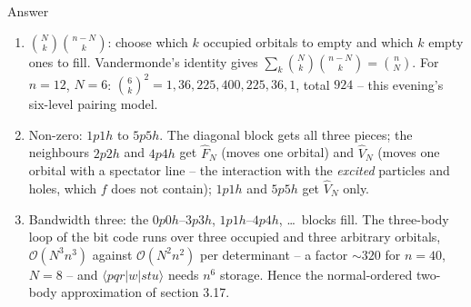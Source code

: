\documentclass[aspectratio=169,10pt]{beamer}
\newcounter{thinkctr}
\newcommand{\thinka}[1]{%
  \begin{tcolorbox}[colback=paleteal,colframe=teal,title={\bfseries Answer to pause \#\thethinkctr}]
  #1
  \end{tcolorbox}}
\newcommand{\element}[3]{\langle #1\vert #2\vert #3\rangle}
\begin{document}
\begin{frame}{Answer}
  \thinka{
  \begin{enumerate}
    \item $\binom{N}{k}\binom{n-N}{k}$: choose which $k$ occupied orbitals to empty and which $k$ empty ones to fill. Vandermonde's identity gives $\sum_k\binom{N}{k}\binom{n-N}{k}=\binom{n}{N}$. For $n=12$, $N=6$: $\binom6k^2=1,36,225,400,225,36,1$, total $924$ -- this evening's six-level pairing model.
    \item Non-zero: $1p1h$ to $5p5h$. The diagonal block gets all three pieces; the neighbours $2p2h$ and $4p4h$ get $\hat{F}_N$ (moves one orbital) and $\hat{V}_N$ (moves one orbital with a spectator line -- the interaction with the \emph{excited} particles and holes, which $f$ does not contain); $1p1h$ and $5p5h$ get $\hat{V}_N$ only.
    \item Bandwidth three: the $0p0h$--$3p3h$, $1p1h$--$4p4h$, \dots\ blocks fill. The three-body loop of the bit code runs over three occupied and three arbitrary orbitals, $\mathcal{O}(N^3n^3)$ against $\mathcal{O}(N^2n^2)$ per determinant -- a factor $\sim320$ for $n=40$, $N=8$ -- and $\element{pqr}{w}{stu}$ needs $n^6$ storage. Hence the normal-ordered two-body approximation of section 3.17.
  \end{enumerate}}
\end{frame}
\end{document}

